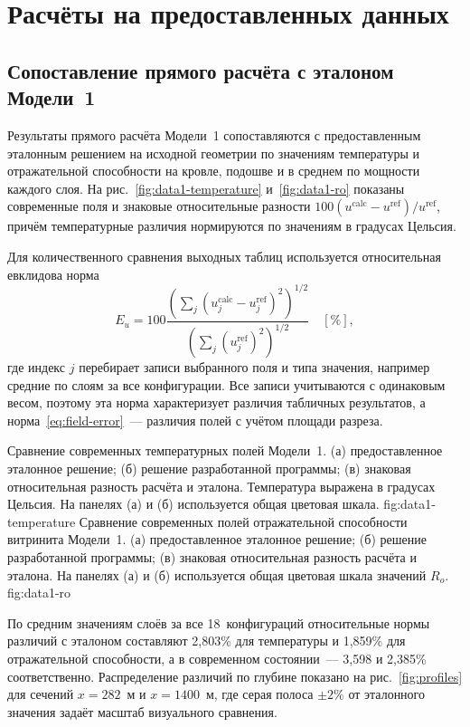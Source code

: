\section{Расчёты на предоставленных данных}
\label{sec:results}

\subsection{Сопоставление прямого расчёта с эталоном Модели~1}

Результаты прямого расчёта Модели~1 сопоставляются с предоставленным эталонным решением на исходной геометрии по значениям температуры и отражательной способности на кровле, подошве и в среднем по мощности каждого слоя. На рис.~\ref{fig:data1-temperature} и~\ref{fig:data1-ro} показаны современные поля и знаковые относительные разности $100(u^{\mathrm{calc}}-u^{\mathrm{ref}})/u^{\mathrm{ref}}$, причём температурные различия нормируются по значениям в градусах Цельсия.

Для количественного сравнения выходных таблиц используется относительная евклидова норма
\begin{equation}
 E_u = 100\frac{\left(\sum_j (u_j^{\mathrm{calc}} - u_j^{\mathrm{ref}})^2\right)^{1/2}}
                   {\left(\sum_j (u_j^{\mathrm{ref}})^2\right)^{1/2}}\quad[\%],
 \label{eq:table-error}
\end{equation}
где индекс $j$ перебирает записи выбранного поля и типа значения, например средние по слоям за все конфигурации. Все записи учитываются с одинаковым весом, поэтому эта норма характеризует различия табличных результатов, а норма~\eqref{eq:field-error}~--- различия полей с учётом площади разреза.

 {Сравнение современных температурных полей Модели~1. (а) предоставленное эталонное решение; (б) решение разработанной программы; (в) знаковая относительная разность расчёта и эталона. Температура выражена в градусах Цельсия. На панелях (а) и (б) используется общая цветовая шкала.} {fig:data1-temperature}
 {Сравнение современных полей отражательной способности витринита Модели~1. (а) предоставленное эталонное решение; (б) решение разработанной программы; (в) знаковая относительная разность расчёта и эталона. На панелях (а) и (б) используется общая цветовая шкала значений $R_o$.} {fig:data1-ro}

По средним значениям слоёв за все 18~конфигураций относительные нормы различий с эталоном составляют 2,803\% для температуры и 1,859\% для отражательной способности, а в современном состоянии~--- 3,598 и 2,385\% соответственно. Распределение различий по глубине показано на рис.~\ref{fig:profiles} для сечений $x=282$~м и $x=1400$~м, где серая полоса $\pm2\%$ от эталонного значения задаёт масштаб визуального сравнения.

